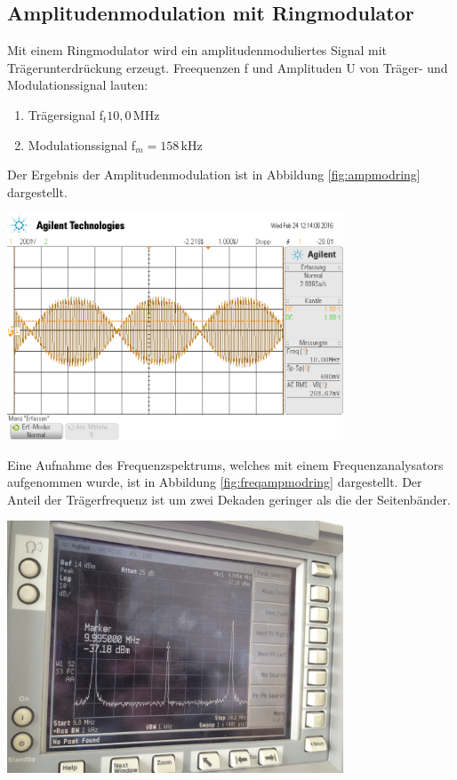 \documentclass[]{scrartcl}
\begin{document}
\subsection{Amplitudenmodulation mit Ringmodulator}
Mit einem Ringmodulator wird ein amplitudenmoduliertes Signal mit Trägerunterdrückung erzeugt. Freequenzen f und Amplituden U von Träger- und Modulationssignal lauten:
\begin{enumerate}
	\item Trägersignal f$_t10,0$\,MHz
	\item Modulationssignal f$_m=158$\,kHz
\end{enumerate}
Der Ergebnis der Amplitudenmodulation ist in Abbildung \ref{fig:ampmodring} dargestellt.
\begin{center}
	\includegraphics[width=10cm]{images/ampmodring.png}
	\label{fig:ampmodring}
\end{center}
Eine Aufnahme des Frequenzspektrums, welches mit einem Frequenzanalysators aufgenommen wurde, ist in Abbildung \ref{fig:freqampmodring} dargestellt. Der Anteil der Trägerfrequenz ist um zwei Dekaden geringer als die der Seitenbänder. 
\begin{center}
	\includegraphics[width=10cm]{images/freqampmodring.png}
	\label{fig:freqampmodring}
\end{center}
\end{document}

